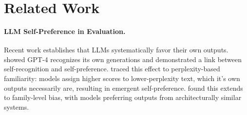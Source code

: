 


\section{Related Work}

\paragraph{LLM Self-Preference in Evaluation.}
Recent work establishes that LLMs systematically favor their own outputs. \citet{panickssery2024llmevaluatorsrecognizefavor} showed GPT-4 recognizes its own generations and demonstrated a link between self-recognition and self-preference. \citet{wataoka2024selfpreferencebias} traced this effect to perplexity-based familiarity: models assign higher scores to lower-perplexity text, which it's own outputs necessarily are, resulting in emergent self-preference. \citet{spiliopoulou2025playfavoritesstatisticalmethod} found this extends to family-level bias, with models preferring outputs from architecturally similar systems.  

